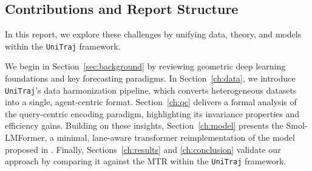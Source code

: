 \subsection{Contributions and Report Structure}
In this report, we explore these challenges by unifying data, theory, and models within the \texttt{UniTraj} framework.

We begin in Section~\ref{sec:background} by reviewing geometric deep learning foundations and key forecasting paradigms. In Section~\ref{ch:data}, we introduce \texttt{UniTraj}'s data harmonization pipeline, which converts heterogeneous datasets into a single, agent-centric format. Section~\ref{ch:qc} delivers a formal analysis of the query-centric encoding paradigm, highlighting its invariance properties and efficiency gains. Building on these insights, Section~\ref{ch:model} presents the Smol-LMFormer, a minimal, lane-aware transformer reimplementation of the model proposed in \cite{lmformerYadav2025}. Finally, Sections~\ref{ch:results} and \ref{ch:conclusion} validate our approach by comparing it against the MTR within the \texttt{UniTraj} framework.
